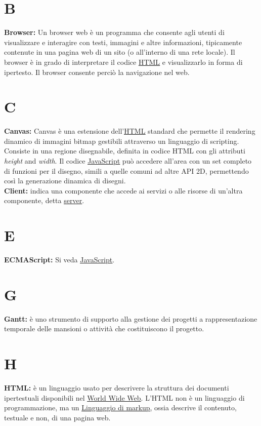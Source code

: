 \section*{B}
\hypertarget{browser}{}
\textbf{Browser:}
Un browser web \` e un programma che consente agli utenti di visualizzare e interagire con testi, immagini e altre informazioni, tipicamente contenute in una pagina web di un sito (o all'interno di una rete locale).
Il browser \` e in grado di interpretare il codice \hyperlink{html}{\underline{HTML}} e visualizzarlo in forma di ipertesto. Il browser consente perci\` o la navigazione nel web.\\

\section*{C}
\hypertarget{canvas}{}
\textbf{Canvas:}
Canvas \` e una estensione dell'\hyperlink{html}{\underline{HTML}} standard che permette il rendering dinamico di immagini bitmap gestibili attraverso un linguaggio di scripting.  Consiste in una regione disegnabile, definita in codice HTML con gli attributi \textit{height} and \textit{width}. Il codice \hyperlink{javascript}{\underline{JavaScript}} pu\`o accedere all'area con un set completo di funzioni per il disegno, simili a quelle comuni ad altre API 2D, permettendo cos\`i la generazione dinamica di disegni.\\

\hypertarget{client}{}
\textbf{Client:}
indica una componente che accede ai servizi o alle risorse di un'altra componente, detta \hyperlink{server}{\underline{server}}.\\

\section*{E}
\hypertarget{ecmascript}{}
\textbf{ECMAScript:}
\text Si veda \hyperlink{javascript}{\underline{JavaScript}}.\\

\section*{G}
\hypertarget{gantt}{}
\textbf{Gantt:}
\` e uno strumento di supporto alla gestione dei progetti a rappresentazione temporale delle mansioni o attivit\`a che costituiscono il progetto. \\

\section*{H}
\hypertarget{html}{}
\textbf{HTML:}
\` e un linguaggio usato per descrivere la struttura dei documenti ipertestuali disponibili nel \hyperlink{www}{\underline{World Wide Web}}.
L'HTML non \` e un linguaggio di programmazione, ma un \hyperlink{linguaggio di markup}{\underline{Linguaggio di markup}}, ossia descrive il contenuto, testuale e non, di una pagina web.\\

